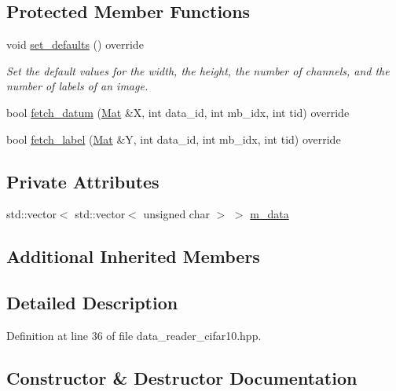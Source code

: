 \subsection*{Protected Member Functions}
\begin{DoxyCompactItemize}
\item 
void \hyperlink{classlbann_1_1cifar10__reader_a4c5389d0a6641716c96aa07e58fa4e88}{set\+\_\+defaults} () override
\begin{DoxyCompactList}\small\item\em Set the default values for the width, the height, the number of channels, and the number of labels of an image. \end{DoxyCompactList}\item 
bool \hyperlink{classlbann_1_1cifar10__reader_a590c672731bbdcb6e7fd8fd300d004d5}{fetch\+\_\+datum} (\hyperlink{base_8hpp_a68f11fdc31b62516cb310831bbe54d73}{Mat} \&X, int data\+\_\+id, int mb\+\_\+idx, int tid) override
\item 
bool \hyperlink{classlbann_1_1cifar10__reader_a7419de03462b5ff38b8174695a9c06dd}{fetch\+\_\+label} (\hyperlink{base_8hpp_a68f11fdc31b62516cb310831bbe54d73}{Mat} \&Y, int data\+\_\+id, int mb\+\_\+idx, int tid) override
\end{DoxyCompactItemize}
\subsection*{Private Attributes}
\begin{DoxyCompactItemize}
\item 
std\+::vector$<$ std\+::vector$<$ unsigned char $>$ $>$ \hyperlink{classlbann_1_1cifar10__reader_a9b47dab5c16987441ec5276d91a5aab5}{m\+\_\+data}
\end{DoxyCompactItemize}
\subsection*{Additional Inherited Members}


\subsection{Detailed Description}


Definition at line 36 of file data\+\_\+reader\+\_\+cifar10.\+hpp.



\subsection{Constructor \& Destructor Documentation}
\mbox{\label{classlbann_1_1cifar10__reader_a3e4fca66c9bd38798e56379d4a2cd6c0}} 
